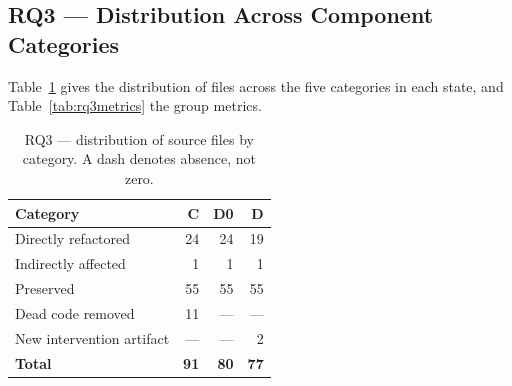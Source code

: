 \documentclass{sbc2019}%
\begin{document}
\subsection{RQ3 --- Distribution Across Component Categories}\label{sec:rq3}

Table~\ref{tab:rq3dist} gives the distribution of files across the five
categories in each state, and Table~\ref{tab:rq3metrics} the group metrics.

\begin{table}[htb]
\centering
\caption{RQ3 --- distribution of source files by category. A dash denotes
absence, not zero.}\label{tab:rq3dist}
\small
\begin{tabular}{lrrr}
\toprule
\textbf{Category} & \textbf{C} & \textbf{D0} & \textbf{D} \\
\midrule
Directly refactored        & 24 & 24 & 19 \\
Indirectly affected        & 1  & 1  & 1 \\
Preserved                  & 55 & 55 & 55 \\
Dead code removed          & 11 & ---& --- \\
New intervention artifact  & ---& ---& 2 \\
\midrule
\textbf{Total}             & \textbf{91} & \textbf{80} & \textbf{77} \\
\bottomrule
\end{tabular}
\end{table}
\end{document}
